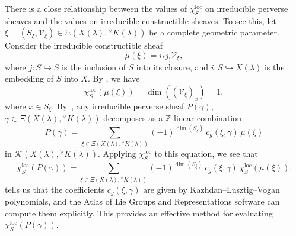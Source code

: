 \documentclass[a4paper, 11pt]{article}
\begin{document}
There is a close relationship between the values of
$\chi_{S}^{\mathrm{loc}}$ on irreducible perverse sheaves and the
values on
irreducible constructible sheaves.  To see this, let $\xi = (S_\xi,
\mathcal{V}_\xi) \in \Xi(X(\lambda),{}^{\vee}K(\lambda))$ be a
complete geometric parameter.  
Consider the irreducible constructible sheaf
\[
\mu(\xi) = i_\ast j_! \mathcal{V}_\xi,
\]
where $j\colon S \hookrightarrow \overline{S}$ is the inclusion
of $S$ into its closure, and $i\colon \overline{S} \hookrightarrow
X(\lambda)$ is the embedding of $\overline{S}$ into $X$. 
By \cite[Corollary~23.3(a)-(b)]{ABV}, we have
\[
\chi_S^{\mathrm{loc}}(\mu(\xi)) = \dim( (\mathcal{V}_\xi)_x)=1,
\]
where $x\in S_\xi$.
By~\cite[(7.11)(a)]{ABV},  any
irreducible perverse sheaf $P(\gamma)$,  $\gamma \in
\Xi(X(\lambda),{}^{\vee}K(\lambda))$ decomposes as a
$\mathbb{Z}$-linear combination
$$P(\gamma) = \sum_{\xi \in \Xi(X(\lambda),{}^{\vee}K(\lambda))} (-1)^{\dim(S_\xi)}
\ c_g(\xi,\gamma) \, \mu(\xi) $$
in $\mathscr{K}(X(\lambda), {}^{\vee}K(\lambda))$.  
Applying $\chi_S^{\mathrm{loc}}$ to this equation, we see that
$$\chi_S^{\mathrm{loc}}(P(\gamma)) = \sum_{\xi \in \Xi(X(\lambda), {}^{\vee}K(\lambda))}
(-1)^{\dim(S_\xi)} \ c_g(\xi,\gamma)\, \chi_{S}^{\mathrm{loc}}(\mu(\xi)).$$ 
\cite[Theorem~16.19]{ABV} tells us that the coefficients
$c_g(\xi,\gamma)$ are given by Kazhdan–Lusztig–Vogan polynomials,
and the Atlas of Lie Groups and Representations software can compute
them explicitly. This 
provides an effective method for evaluating
$\chi_S^{\mathrm{loc}}(P(\gamma))$.
\end{document}
